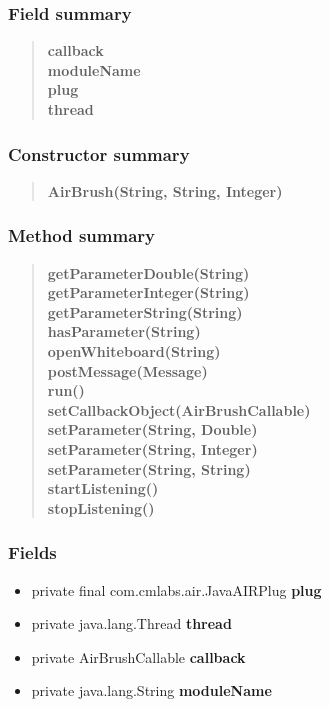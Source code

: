 {{\subsubsection{Field summary}{
\begin{verse}
{\bf callback} \\
{\bf moduleName} \\
{\bf plug} \\
{\bf thread} \\
\end{verse}
}
\subsubsection{Constructor summary}{
\begin{verse}
{\bf AirBrush(String, String, Integer)} \\
\end{verse}
}
\subsubsection{Method summary}{
\begin{verse}
{\bf getParameterDouble(String)} \\
{\bf getParameterInteger(String)} \\
{\bf getParameterString(String)} \\
{\bf hasParameter(String)} \\
{\bf openWhiteboard(String)} \\
{\bf postMessage(Message)} \\
{\bf run()} \\
{\bf setCallbackObject(AirBrushCallable)} \\
{\bf setParameter(String, Double)} \\
{\bf setParameter(String, Integer)} \\
{\bf setParameter(String, String)} \\
{\bf startListening()} \\
{\bf stopListening()} \\
\end{verse}
}
\subsubsection{Fields}{
\begin{itemize}
\item{
\label{amber.common.AirBrush.plug}private final com.cmlabs.air.JavaAIRPlug {\bf plug}}
\item{
\label{amber.common.AirBrush.thread}private java.lang.Thread {\bf thread}}
\item{
\label{amber.common.AirBrush.callback}private AirBrushCallable {\bf callback}}
\item{
\label{amber.common.AirBrush.moduleName}private java.lang.String {\bf moduleName}}
\end{itemize}
}
}}
